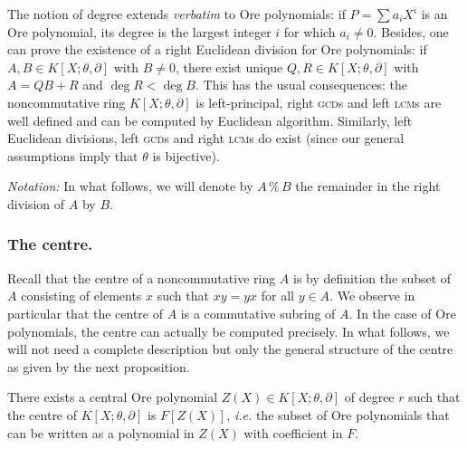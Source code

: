 \documentclass[a4paper]{llncs}
\newcommand{\id}{\textrm{\rm id}}
\renewcommand{\mod}{\,\%\,}
\begin{document}

The notion of degree extends \emph{verbatim} to Ore polynomials: if $P = 
\sum a_iX^i$ is an Ore polynomial, its degree is the largest integer $i$ 
for which $a_i \neq 0$.
Besides, one can prove the existence of a right Euclidean division for 
Ore polynomials: if $A, B \in K[X;\theta,\partial]$ with $B \neq 0$, 
there exist unique $Q, R \in K[X;\theta,\partial]$ with $A = QB+R$ and 
$\deg R < \deg B$. This has the usual consequences: the noncommutative
ring $K[X;\theta,\partial]$ is left-principal, right \textsc{gcd}s and
left \textsc{lcm}s are well defined and can be computed by Euclidean
algorithm. 
Similarly, left Euclidean divisions, left \textsc{gcd}s and right 
\textsc{lcm}s do exist (since our general assumptions imply that
$\theta$ is bijective).

\medskip

\noindent
\textit{Notation:}
In what follows, we will denote by $A \mod B$ the remainder in the 
right division of $A$ by $B$.

\subsubsection*{The centre.}

Recall that the centre of a noncommutative ring $A$ is by definition
the subset of $A$ consisting of elements $x$ such that $xy = yx$ for
all $y \in A$. We observe in particular that the centre of $A$ is a
commutative subring of $A$.
In the case of Ore polynomials, the centre can actually be computed
precisely.
In what follows, we will not need a complete description but only
the general structure of the centre as given by the next proposition.

\begin{proposition}
\label{prop:centre}
There exists a central Ore polynomial $Z(X) \in K[X; \theta, \partial]$ of 
degree $r$ such that the centre of $K[X; \theta, \partial]$ is 
$F[Z(X)]$, \emph{i.e.} the subset of Ore polynomials that can be
written as a polynomial in $Z(X)$ with coefficient in $F$.
\end{proposition}
\end{document}
